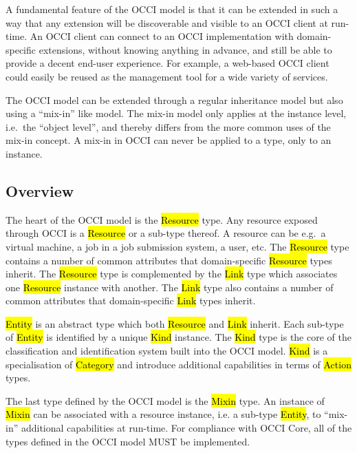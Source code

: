 \documentclass[10pt,a4paper,british]{article}
\begin{document}
A fundamental feature of the OCCI model is that it can be extended in such a
way that any extension will be discoverable and visible to an OCCI client at
run-time. An OCCI client can connect to an OCCI implementation with
domain-specific extensions, without knowing anything in advance, and still be
able to provide a decent end-user experience. For example, a web-based OCCI
client could easily be reused as the management tool for a wide variety of
services.

The OCCI model can be extended through a regular inheritance model but also
using a ``mix-in'' like model. The mix-in model only applies at the instance
level, i.e.~the ``object level'', and thereby differs from the more common uses
of the mix-in concept. A mix-in in OCCI can never be applied to a type, only to
an instance.

\subsection{Overview}

The heart of the OCCI model is the \hl{Resource} type. Any resource exposed
through OCCI is a \hl{Resource} or a sub-type thereof.
A resource can be e.g.~a virtual machine, a job in a job submission system, a
user, etc.
%
The \hl{Resource} type contains a number of common attributes that
domain-specific \hl{Resource} types inherit. The \hl{Resource} type is
complemented by the \hl{Link} type which associates one \hl{Resource} instance
with another.
%
The \hl{Link} type also contains a number of common attributes that
domain-specific \hl{Link} types inherit.

\hl{Entity} is an abstract type which both \hl{Resource} and \hl{Link} inherit.
Each sub-type of \hl{Entity} is identified by a unique \hl{Kind} instance.
%
The \hl{Kind} type is the core of the classification and identification
system built into the OCCI model. \hl{Kind} is a specialisation of
\hl{Category} and introduce additional capabilities in terms of \hl{Action}
types.

The last type defined by the OCCI model is the \hl{Mixin} type. An instance of
\hl{Mixin} can be associated with a resource instance, i.e. a sub-type
\hl{Entity}, to ``mix-in'' additional capabilities at run-time.
%
For compliance with OCCI Core, all of the types defined in the OCCI model MUST
be implemented.
\end{document}
